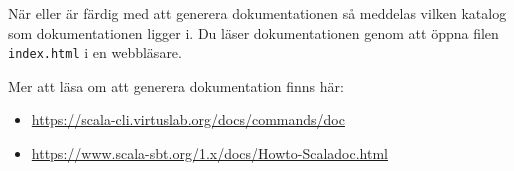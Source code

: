 När  eller  är färdig med att generera dokumentationen så meddelas vilken katalog som dokumentationen ligger i. Du läser dokumentationen genom att öppna filen \texttt{index.html} i en webbläsare.

Mer att läsa om att generera dokumentation finns här: 
\begin{itemize}
\item \url{https://scala-cli.virtuslab.org/docs/commands/doc}
\item \url{https://www.scala-sbt.org/1.x/docs/Howto-Scaladoc.html}
\end{itemize}







